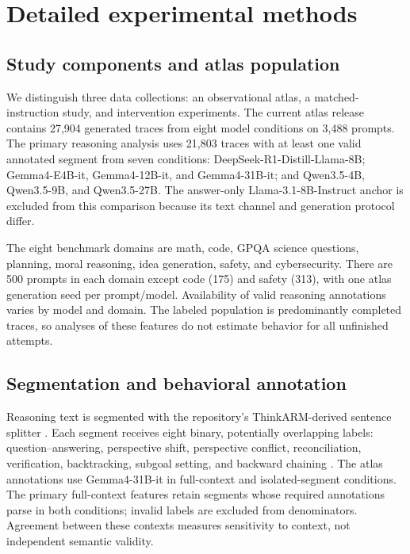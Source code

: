 \section{Detailed experimental methods}\label{app:methods}
\subsection{Study components and atlas population}
We distinguish three data collections: an observational atlas, a matched-instruction study, and intervention experiments. The current atlas release contains 27,904 generated traces from eight model conditions on 3,488 prompts. The primary reasoning analysis uses 21,803 traces with at least one valid annotated segment from seven conditions: DeepSeek-R1-Distill-Llama-8B; Gemma4-E4B-it, Gemma4-12B-it, and Gemma4-31B-it; and Qwen3.5-4B, Qwen3.5-9B, and Qwen3.5-27B. The answer-only Llama-3.1-8B-Instruct anchor is excluded from this comparison because its text channel and generation protocol differ.

The eight benchmark domains are math, code, GPQA science questions, planning, moral reasoning, idea generation, safety, and cybersecurity. There are 500 prompts in each domain except code (175) and safety (313), with one atlas generation seed per prompt/model. Availability of valid reasoning annotations varies by model and domain. The labeled population is predominantly completed traces, so analyses of these features do not estimate behavior for all unfinished attempts.


\subsection{Segmentation and behavioral annotation}
Reasoning text is segmented with the repository's ThinkARM-derived sentence splitter \citep{li2025thinkarm}. Each segment receives eight binary, potentially overlapping labels: question--answering, perspective shift, perspective conflict, reconciliation, verification, backtracking, subgoal setting, and backward chaining \citep{kim2026society,gandhi2025habits}. The atlas annotations use Gemma4-31B-it in full-context and isolated-segment conditions. The primary full-context features retain segments whose required annotations parse in both conditions; invalid labels are excluded from denominators. Agreement between these contexts measures sensitivity to context, not independent semantic validity.

